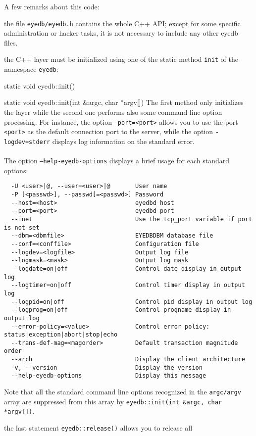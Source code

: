 \normalsize
A few remarks about this code:
\be
\item the file \texttt{eyedb/eyedb.h} contains the whole \eyedb C++ API; except
for some specific administration or hacker tasks, it is not necessary
to include any other eyedb files.
\item the \eyedb C++ layer must be initialized using one of the static method
\texttt{init} of the namespace \texttt{eyedb}:
\be
\item static void eyedb::init()
\item static void eyedb::init(int \&argc, char *argv[])
\ee
The first method only initializes the \eyedb layer while the second
one performs also some command line option processing.
For instance, the option \texttt{--port=<port>} allows you to use
the port \texttt{<port>} as the default connection port to the \eyedb
server, while the option \texttt{-logdev=stderr} displays log information
on the standard error.
\\
\\
The option \texttt{--help-eyedb-options} displays a brief usage for each standard options:
\verbsize
\begin{verbatim}
  -U <user>|@, --user=<user>|@       User name
  -P [<passwd>], --passwd[=<passwd>] Password
  --host=<host>                      eyedbd host
  --port=<port>                      eyedbd port
  --inet                             Use the tcp_port variable if port is not set
  --dbm=<dbmfile>                    EYEDBDBM database file
  --conf=<conffile>                  Configuration file
  --logdev=<logfile>                 Output log file
  --logmask=<mask>                   Output log mask
  --logdate=on|off                   Control date display in output log
  --logtimer=on|off                  Control timer display in output log
  --logpid=on|off                    Control pid display in output log
  --logprog=on|off                   Control progname display in output log
  --error-policy=<value>             Control error policy: status|exception|abort|stop|echo
  --trans-def-mag=<magorder>         Default transaction magnitude order
  --arch                             Display the client architecture
  -v, --version                      Display the version
  --help-eyedb-options               Display this message
\end{verbatim}
\normalsize
Note that all the standard command line options recognized in the
\texttt{argc/argv} array are suppressed from this array by
\texttt{eyedb::init(int \&argc, char *argv[])}.
\item the last statement \texttt{eyedb::release()} allows you to release all
